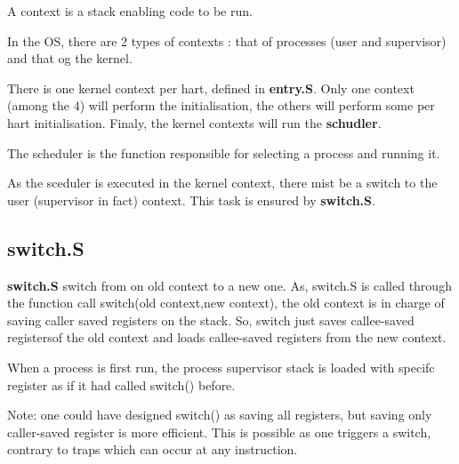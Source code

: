 \documentclass[10pt, a4paper]{article}
\begin{document}
A context is a stack enabling code to be run.

In the OS, there are 2 types of contexts : that of processes (user and supervisor) and that og the kernel.

There is one kernel context per hart, defined in \textbf{entry.S}. Only one context (among the 4) will perform the initialisation, the others will perform some per hart initialisation. Finaly, the kernel contexts will run the \textbf{schudler}.

The scheduler is the function responsible for selecting a process and running it.

As the sceduler is executed in the kernel context, there mist be a switch to the user (supervisor in fact) context. This task is ensured by \textbf{switch.S}.

\subsection{switch.S}

\textbf{switch.S} switch from on old context to a new one. As, switch.S is called through the function call switch(old context,new context), the old context is in charge of saving caller saved registers on the stack. So, switch just saves callee-saved registersof the old context and loads callee-saved registers from the new context.

When a process is first run, the process supervisor stack is loaded with specifc register as if it had called switch() before.

Note: one could have designed switch() as saving all registers, but saving only caller-saved register is more efficient. This is possible as one triggers a switch, contrary to traps which can occur at any instruction.
\end{document}
